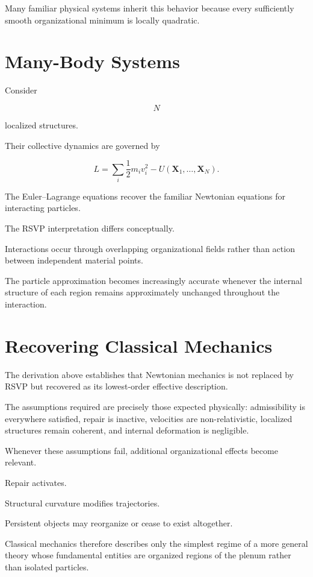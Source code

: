\documentclass[11pt,oneside]{book}
\numberwithin{equation}{chapter}
\theoremstyle{definition}
\theoremstyle{plain}
\begin{document}
Many familiar physical systems inherit this behavior because every
sufficiently smooth organizational minimum is locally quadratic.

\section{Many-Body Systems}

Consider

\[
N
\]

localized structures.

Their collective dynamics are governed by

\[
L
=
\sum_i
\frac12
m_i
v_i^2
-
U(\mathbf X_1,\ldots,\mathbf X_N).
\]

The Euler--Lagrange equations recover the familiar Newtonian equations for
interacting particles.

The RSVP interpretation differs conceptually.

Interactions occur through overlapping organizational fields rather than
action between independent material points.

The particle approximation becomes increasingly accurate whenever the
internal structure of each region remains approximately unchanged throughout
the interaction.

\section{Recovering Classical Mechanics}

The derivation above establishes that Newtonian mechanics is not replaced by
RSVP but recovered as its lowest-order effective description.

The assumptions required are precisely those expected physically:
admissibility is everywhere satisfied, repair is inactive, velocities are
non-relativistic, localized structures remain coherent, and internal
deformation is negligible.

Whenever these assumptions fail, additional organizational effects become
relevant.

Repair activates.

Structural curvature modifies trajectories.

Persistent objects may reorganize or cease to exist altogether.

Classical mechanics therefore describes only the simplest regime of a more
general theory whose fundamental entities are organized regions of the
plenum rather than isolated particles.
\end{document}
